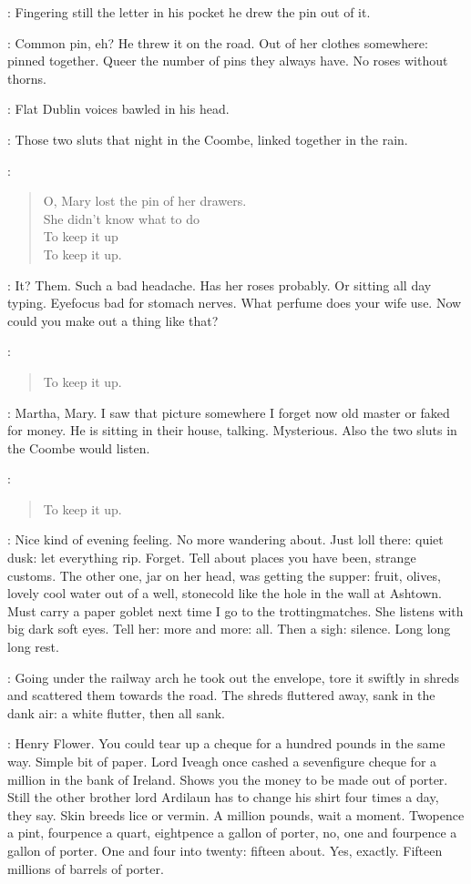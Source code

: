 :
Fingering still the letter in his pocket
he drew the pin out of it.

\BloomInt:
Common pin, eh?
He threw it on the road.
Out of her clothes somewhere:
pinned together.
Queer the number of pins they always have.
No roses without thorns.

:
Flat Dublin voices bawled in his head.

\BloomInt:
Those two sluts that night in the Coombe, linked together in the rain.

\sluts:
\begin{verse}
    O, Mary lost the pin of her drawers. \\
    She didn't know what to do \\
    To keep it up \\
    To keep it up.
\end{verse}

\BloomInt:
It?
Them.
Such a bad headache.
Has her roses probably.
Or sitting all day typing.
Eyefocus bad for stomach nerves.
What perfume does your wife use.
Now could you make out a thing like that?

\sluts:
\begin{verse}
    To keep it up.
\end{verse}

\BloomInt:
Martha, Mary.
I saw that picture somewhere I forget now
old master or faked for money.
He is sitting in their house, talking.
Mysterious.
Also the two sluts in the Coombe would listen.

\sluts:
\begin{verse}
    To keep it up.
\end{verse}

\BloomInt:
Nice kind of evening feeling.
No more wandering about.
Just loll there:
quiet dusk:
let everything rip.
Forget.
Tell about places you have been,
strange customs.
The other one,
jar on her head,
was getting the supper:
fruit, olives,
lovely cool water out of a well,
stonecold like the hole in the wall at Ashtown.
Must carry a paper goblet next time I go to the trottingmatches.
She listens with big dark soft eyes.
Tell her:
more and more:
all.
Then a sigh:
silence.
Long long long rest.

:
Going under the railway arch
he took out the envelope,
tore it swiftly in shreds
and scattered them towards the road.
The shreds fluttered away,
sank in the dank air:
a white flutter, then all sank.

\BloomInt:
Henry Flower.
You could tear up a cheque for a hundred pounds in the same way.
Simple bit of paper.
Lord Iveagh once cashed a sevenfigure cheque for a million in the bank of Ireland.
Shows you the money to be made out of porter.
Still the other brother
lord Ardilaun
has to change his shirt four times a day,
they say.
Skin breeds lice or vermin.
A million pounds, wait a moment.
Twopence a pint,
fourpence a quart,
eightpence a gallon of porter,
no, one and fourpence a gallon of porter.
One and four into twenty:
fifteen about.
Yes, exactly.
Fifteen millions of barrels of porter.

